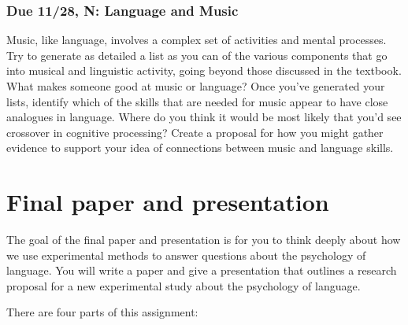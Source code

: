 \documentclass[
  letterpaper,
  DIV=11,
  numbers=noendperiod]{scrreprt}
\begin{document}
\hypertarget{due-1128-n-language-and-music}{%
\subsection*{Due 11/28, N: Language and
Music}\label{due-1128-n-language-and-music}}

Music, like language, involves a complex set of activities and mental
processes. Try to generate as detailed a list as you can of the various
components that go into musical and linguistic activity, going beyond
those discussed in the textbook. What makes someone good at music or
language? Once you've generated your lists, identify which of the skills
that are needed for music appear to have close analogues in language.
Where do you think it would be most likely that you'd see crossover in
cognitive processing? Create a proposal for how you might gather
evidence to support your idea of connections between music and language
skills.

\hypertarget{final-paper-and-presentation}{%
\chapter*{Final paper and
presentation}\label{final-paper-and-presentation}}


The goal of the final paper and presentation is for you to think deeply
about how we use experimental methods to answer questions about the
psychology of language. You will write a paper and give a presentation
that outlines a research proposal for a new experimental study about the
psychology of language.

There are four parts of this assignment:
\end{document}
